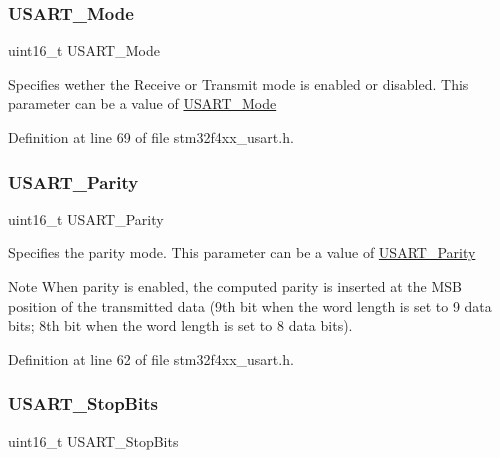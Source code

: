 \subsubsection{\texorpdfstring{U\+S\+A\+R\+T\+\_\+\+Mode}{USART\_Mode}}
{\footnotesize\ttfamily uint16\+\_\+t U\+S\+A\+R\+T\+\_\+\+Mode}

Specifies wether the Receive or Transmit mode is enabled or disabled. This parameter can be a value of \hyperlink{group___u_s_a_r_t___mode}{U\+S\+A\+R\+T\+\_\+\+Mode} 

Definition at line 69 of file stm32f4xx\+\_\+usart.\+h.

\mbox{\label{struct_u_s_a_r_t___init_type_def_a4edcc84644c8553a1a6e841c48ea8413}} 
\subsubsection{\texorpdfstring{U\+S\+A\+R\+T\+\_\+\+Parity}{USART\_Parity}}
{\footnotesize\ttfamily uint16\+\_\+t U\+S\+A\+R\+T\+\_\+\+Parity}

Specifies the parity mode. This parameter can be a value of \hyperlink{group___u_s_a_r_t___parity}{U\+S\+A\+R\+T\+\_\+\+Parity} \begin{DoxyNote}{Note}
When parity is enabled, the computed parity is inserted at the M\+SB position of the transmitted data (9th bit when the word length is set to 9 data bits; 8th bit when the word length is set to 8 data bits). 
\end{DoxyNote}


Definition at line 62 of file stm32f4xx\+\_\+usart.\+h.

\mbox{\label{struct_u_s_a_r_t___init_type_def_aa58409990a6a0bc99f432eb90e204c0f}} 
\subsubsection{\texorpdfstring{U\+S\+A\+R\+T\+\_\+\+Stop\+Bits}{USART\_StopBits}}
{\footnotesize\ttfamily uint16\+\_\+t U\+S\+A\+R\+T\+\_\+\+Stop\+Bits}

